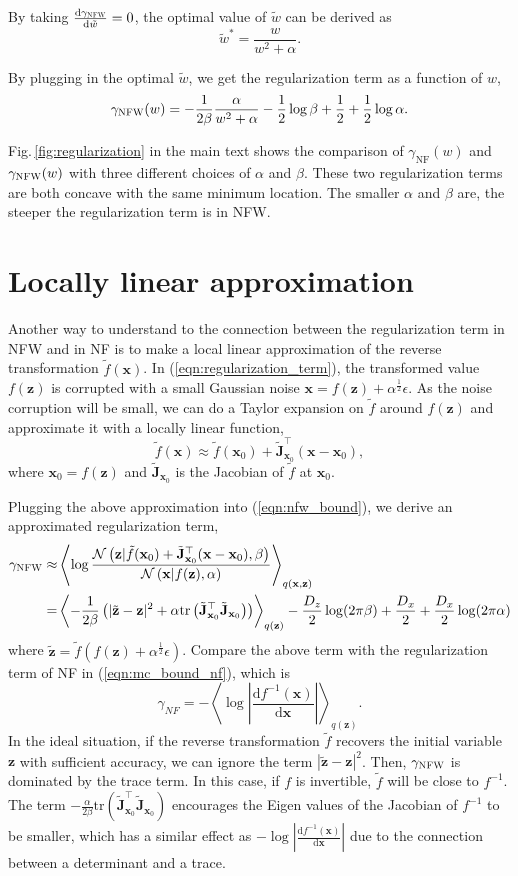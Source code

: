\documentclass{article}
\newcommand{\xV}{\mathbf{x}}
\newcommand{\zV}{\mathbf{z}}
\newcommand{\expectationDist}[2]{\left\langle #1 \right\rangle _{#2}}
\newcommand{\diff}{\text{d}}
\newcommand{\J}{\mathbf{J}}
\newcommand{\gaussianDist}[3]{\mathcal{N}\left(#1|#2,#3\right)}
\newcommand{\tr}[1]{\text{tr}\left(#1\right)}
\newcommand{\acr}[1]{\textsc{#1}\xspace}
\newcommand{\us}{\acr{NFW}}
\begin{document}
By taking $\frac{\diff \gamma_{\text{\us}}}{\diff \tilde{w}}=0$, the optimal value of $\tilde{w}$ can be derived as 
$$
\tilde{w}^* = \frac{w}{w^2+\alpha}.
$$

By plugging in the optimal $\tilde{w}$, we get the regularization term as a function of $w$,
$$
\gamma_{\text{\us}}(w)  = -\frac{1}{2\beta}\frac{\alpha}{w^2+\alpha} - \frac{1}{2}\log \beta +\frac{1}{2} + \frac{1}{2}\log \alpha.
$$

Fig.\,\ref{fig:regularization} in the main text shows the comparison of $\gamma_{\text{NF}}(w)$ and $\gamma_{\text{\us}}(w)$ with three different choices of $\alpha$ and $\beta$. These two regularization terms are both concave with the same minimum location. The smaller $\alpha$ and $\beta$ are, the steeper the regularization term is in \us. 

\section{Locally linear approximation}

Another way to understand to the connection between the regularization term in \us and in NF is to make a local linear approximation of the reverse transformation $\tilde{f}(\xV)$. In (\ref{eqn:regularization_term}), the transformed value $f(\zV)$ is corrupted with a small Gaussian noise $\xV = f(\zV) + \alpha^{\frac{1}{2}} \epsilon$. As the noise corruption will be small, we can do a Taylor expansion on $\tilde{f}$ around $f(\zV)$ and approximate it with a locally linear function,
$$
\tilde{f}(\xV) \approx \tilde{f}(\xV_0) +  \tilde{\J}_{\xV_0}^\top(\xV - \xV_0),
$$
where $\xV_0 = f(\zV)$ and $ \tilde{\J}_{\xV_0}$ is the Jacobian of $\tilde{f}$ at $\xV_0$. 

Plugging the above approximation into (\ref{eqn:nfw_bound}), we derive an approximated regularization term,
 \begin{align*}
\gamma_{\text{\us}} \approx& \expectationDist{\log \frac{\gaussianDist{\zV}{\tilde{f}(\xV_0) +  \tilde{\J}_{\xV_0}^\top(\xV - \xV_0)}{\beta}}{\gaussianDist{\xV}{f(\zV)}{\alpha}}}{q(\xV,\zV)} \\
=& \expectationDist{-\frac{1}{2\beta}\left( |\tilde{\zV} - \zV|^2 + \alpha \tr{\tilde{\J}_{\xV_0}^\top \tilde{\J}_{\xV_0}} \right)}{q(\zV)} - \frac{D_z}{2}\log (2\pi\beta) +\frac{D_x}{2} + \frac{D_x}{2}\log (2\pi\alpha)
\end{align*}
where $\tilde{\zV} = \tilde{f}( f(\zV) + \alpha^{\frac{1}{2}} \epsilon)$.
Compare the above term with the regularization term of NF in (\ref{eqn:mc_bound_nf}), which is
$$
\gamma_{NF} = -\expectationDist{\log \left| \frac{\diff f^{-1}(\xV)}{\diff \xV}\right|}{q(\zV)}.
$$
In the ideal situation, if the reverse transformation $\tilde{f}$ recovers the initial variable $\zV$ with sufficient accuracy, we can ignore the term $|\tilde{\zV} - \zV|^2$. Then, $\gamma_{\text{\us}}$ is dominated by the trace term.  In this case, if $f$ is invertible, $\tilde{f}$ will be close to $f^{-1}$. The term $-\frac{\alpha}{2\beta} \tr{\tilde{\J}_{\xV_0}^\top \tilde{\J}_{\xV_0}}$ encourages the Eigen values of the Jacobian of $f^{-1}$ to be smaller, which has a similar effect as $-\log \left| \frac{\diff f^{-1}(\xV)}{\diff \xV}\right|$ due to the connection between a determinant and a trace.
\end{document}
